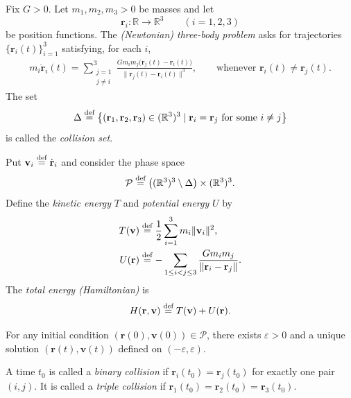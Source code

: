 \documentclass[11pt]{article}
\theoremstyle{romanstyle}
\newcommand{\defequal}{\overset{\textnormal{def}}{=}}
\begin{document}
\begin{definition}
    Fix $G>0$. Let $m_1,m_2,m_3>0$ be masses and let
    \[
        \mathbf{r}_i:\mathbb{R}\to\mathbb{R}^3\qquad (i=1,2,3)
    \]
    be position functions. The \textit{(Newtonian) three-body problem} asks for trajectories
    $\{\mathbf{r}_i(t)\}_{i=1}^3$ satisfying, for each $i$,
    \begin{align*}
        m_i \ddot{\mathbf{r}}_i(t)
        =
        \sum_{\substack{j=1\\ j\neq i}}^{3}
        \frac{G m_i m_j\big(\mathbf{r}_j(t)-\mathbf{r}_i(t)\big)}
        {\|\mathbf{r}_j(t)-\mathbf{r}_i(t)\|^3},
        \qquad
        \text{whenever } \mathbf{r}_i(t)\neq \mathbf{r}_j(t).
    \end{align*}
    The set
    \[
        \Delta \defequal \big\{(\mathbf{r}_1,\mathbf{r}_2,\mathbf{r}_3)\in(\mathbb{R}^3)^3
        \mid \mathbf{r}_i=\mathbf{r}_j \text{ for some }i\neq j\big\}
    \]
    is called the \textit{collision set}.
\end{definition}

\begin{definition}
    Put $\mathbf{v}_i \defequal \dot{\mathbf{r}}_i$ and consider the phase space
    \[
        \mathcal{P}\defequal \big((\mathbb{R}^3)^3\setminus \Delta\big)\times(\mathbb{R}^3)^3.
    \]
    Define the \textit{kinetic energy} $T$ and \textit{potential energy} $U$ by
    \begin{align*}
        T(\mathbf{v}) &\defequal \frac12\sum_{i=1}^3 m_i\|\mathbf{v}_i\|^2,\\
        U(\mathbf{r}) &\defequal -\sum_{1\le i<j\le 3}\frac{Gm_im_j}{\|\mathbf{r}_i-\mathbf{r}_j\|}.
    \end{align*}
    The \textit{total energy (Hamiltonian)} is
    \[
        H(\mathbf{r},\mathbf{v}) \defequal T(\mathbf{v})+U(\mathbf{r}).
    \]
\end{definition}

\begin{lemma}
    For any initial condition $(\mathbf{r}(0),\mathbf{v}(0))\in\mathcal{P}$,
    there exists $\varepsilon>0$ and a unique solution
    $(\mathbf{r}(t),\mathbf{v}(t))$ defined on $(-\varepsilon,\varepsilon)$.
\end{lemma}

\begin{definition}
    A time $t_0$ is called a \textit{binary collision} if $\mathbf{r}_i(t_0)=\mathbf{r}_j(t_0)$ for exactly one pair $(i,j)$.
    It is called a \textit{triple collision} if $\mathbf{r}_1(t_0)=\mathbf{r}_2(t_0)=\mathbf{r}_3(t_0)$.
\end{definition}
\end{document}
